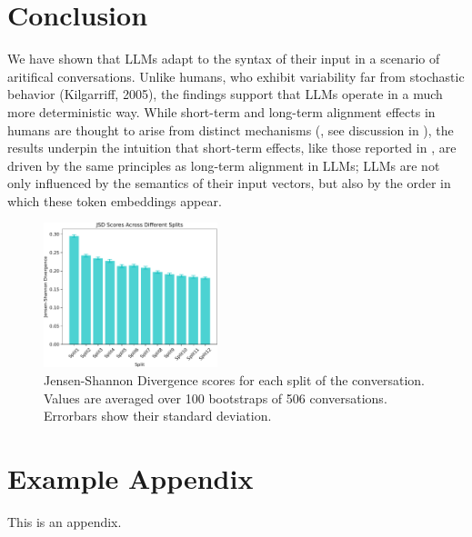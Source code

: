 \documentclass[11pt]{article}
\begin{document}
\section{Conclusion}
We have shown that LLMs adapt to the syntax of their input in a scenario of aritifical conversations. 
Unlike humans, who exhibit variability far from stochastic behavior (Kilgarriff, 2005), the findings support that LLMs operate in a much more deterministic way. While short-term and long-term alignment effects in humans are thought to arise from distinct mechanisms (\citealp{Reitter2014}, see discussion in \citealp{Rasenberg2020framework}), the results underpin the intuition that short-term effects, like those reported in \citealp{cai2024largelanguagemodelsresemble}, are driven by the same principles as long-term alignment in LLMs; LLMs are not only influenced by the semantics of their input vectors, but also by the order in which these token embeddings appear.


\begin{figure}
  \centering
  \includegraphics[width=0.45\textwidth]{figures/jsd_scores_splits}
  \caption{Jensen-Shannon Divergence scores for each split of the conversation. Values are averaged over 100 bootstraps of 506 conversations. Errorbars show their standard deviation.}
  \label{fig:jsd}
\end{figure}
%


\appendix

\section{Example Appendix}
\label{sec:appendix}

This is an appendix.
\end{document}
